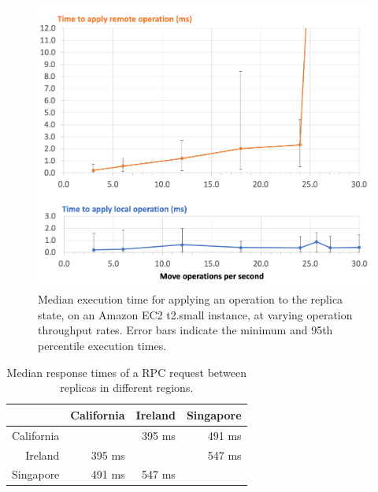 \documentclass[sigconf]{acmart}
\begin{document}
\begin{figure}
  \includegraphics[width=\columnwidth,keepaspectratio=true]{plots.png}
  \caption{Median execution time for applying an operation to the replica state, on an Amazon EC2 t2.small instance, at varying operation throughput rates. Error bars indicate the minimum and 95th percentile execution times.}
  \label{fig:plots}
\end{figure}

\begin{table}
  \caption{Median response times of a RPC request between replicas in different regions.}
  \label{tab:rpc-times}
  \begin{tabular}{r|rrr}
    \toprule
               & California & Ireland & Singapore \\
    \midrule
    California &            & 395 ms  & 491 ms    \\
    Ireland    & 395 ms     &         & 547 ms    \\
    Singapore  & 491 ms     & 547 ms  &           \\
    \bottomrule
\end{tabular}
\end{table}
\end{document}
